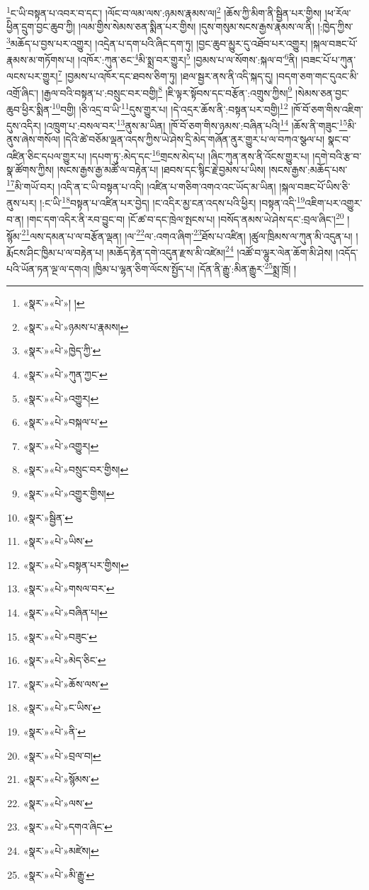 \footnote{«སྣར་»«པེ་»། །}ང་ཡི་བསྟན་པ་འབར་བ་དང་། །ལོང་བ་ལམ་ལས་:ཉམས་རྣམས་ལ།\footnote{«སྣར་»«པེ་»ཉམས་པ་རྣམས།} །ཆོས་ཀྱི་མིག་ནི་སྦྱིན་པར་གྱིས། །ཕ་རོལ་ཕྱིན་དྲུག་བྱང་ཆུབ་ཀྱི། །ལམ་གྱིས་སེམས་ཅན་སྨིན་པར་གྱིས། །དུས་གསུམ་སངས་རྒྱས་རྣམས་ལ་ནི། །:ཁྱེད་ཀྱིས་\footnote{«སྣར་»«པེ་»ཁྱེད་ཀྱི་}མཆོད་པ་བྱས་པར་འགྱུར། །འདྲེན་པ་དག་པའི་ཞིང་དག་ཏུ། །བྱང་ཆུབ་མྱུར་དུ་འཐོབ་པར་འགྱུར། །སྐལ་བཟང་པོ་རྣམས་མ་གཏོགས་པ། །འཁོར་:ཀུན་ཅང་\footnote{«སྣར་»«པེ་»ཀུན་ཀྱང་}མི་སྨྲ་བར་གྱུར།\footnote{«སྣར་»«པེ་»འགྱུར།} །བྱམས་པ་ལ་སོགས་:སྐལ་བ་\footnote{«སྣར་»«པེ་»བསྐལ་པ་}ནི། །བཟང་པོ་པ་ཀུན་ལངས་པར་གྱུར།\footnote{«སྣར་»«པེ་»འགྱུར།} །བྱམས་པ་འཁོར་དང་ཐབས་ཅིག་ཏུ། །ཐལ་སྦྱར་ནས་ནི་འདི་སྐད་དུ། །བདག་ཅག་གང་དུའང་མི་འགྲོ་ཞིང་། །རྒྱལ་བའི་བསྟན་པ་:བསྲུང་བར་བགྱི།\footnote{«སྣར་»«པེ་»བསྲུང་བར་གྱིས།} །ཇི་ལྟར་སྟོབས་དང་བརྩོན་:འགྲུས་ཀྱིས།\footnote{«སྣར་»«པེ་»འགྱུར་གྱིས།} །སེམས་ཅན་བྱང་ཆུབ་ཕྱིར་སྨིན་\footnote{«སྣར་»སྦྱིན་}བགྱི། །ཅི་འདྲ་བ་ཡི་\footnote{«སྣར་»«པེ་»ཡིས་}དུས་གྱུར་པ། །དེ་འདྲར་ཆོས་ནི་:བསྟན་པར་བགྱི།\footnote{«སྣར་»«པེ་»བསྟན་པར་གྱིས།} །ཁོ་བོ་ཅག་གིས་འཇིག་དུས་འདིར། །འཁྲུག་པ་:བསལ་བར་\footnote{«སྣར་»«པེ་»གསལ་བར་}ནུས་མ་ཡིན། །ཁོ་བོ་ཅག་གིས་ཉམས་:བཞིན་པའི།\footnote{«སྣར་»«པེ་»བཞིན་པ།} །ཆོས་ནི་གཟུང་\footnote{«སྣར་»«པེ་»བཟུང་}མི་ནུས་ཞེས་གསོལ། །དེའི་ཚེ་བཅོམ་ལྡན་འདས་ཀྱིས་ཡེ་ཤེས་དྲི་མེད་གཞོན་ནུར་གྱུར་པ་ལ་བཀའ་སྩལ་པ། སྣང་བ་འཛིན་ཅིང་དཔལ་གྱུར་པ། །དཔག་ཏུ་:མེད་དང་\footnote{«སྣར་»«པེ་»མེད་ཅིང་}གྲངས་མེད་པ། །ཞིང་ཀུན་ནས་ནི་འོངས་གྱུར་པ། །དགེ་བའི་རྩ་བ་སྣ་ཚོགས་ཀྱིས། །སངས་རྒྱས་རྒྱ་མཚོ་ལ་བརྟེན་པ། །ཐབས་དང་སྙིང་རྗེ་བྱམས་པ་ཡིས། །སངས་རྒྱས་:མཆོད་པས་\footnote{«སྣར་»«པེ་»ཆོས་ལས་}མི་གཡོ་བར། །འདི་ན་ང་ཡི་བསྟན་པ་འདི། །འཛིན་པ་གཅིག་འགའ་འང་ཡོད་མ་ཡིན། །སྐལ་བཟང་པོ་ཡིས་ཅི་ནུས་པར། །:ང་ཡི་\footnote{«སྣར་»«པེ་»ང་ཡིས་}བསྟན་པ་འཛིན་པར་བྱེད། །ང་འདིར་མྱ་ངན་འདས་པའི་ཕྱིར། །བསྟན་འདི་\footnote{«སྣར་»«པེ་»ནི་}འཇིག་པར་འགྱུར་བ་ན། །གང་དག་འདིར་ནི་རབ་བྱུང་བ། །ངོ་ཚ་བ་དང་ཁྲེལ་སྤངས་པ། །བསོད་ནམས་ཡེ་ཤེས་དང་:བྲལ་ཞིང་།\footnote{«སྣར་»«པེ་»བྲལ་བ།} །སྙོམ་\footnote{«སྣར་»«པེ་»སྙོམས་}ལས་དམན་པ་ལ་བརྩོན་ལྡན། །ལ་\footnote{«སྣར་»«པེ་»ལས་}ལ་:འགའ་ཞིག་\footnote{«སྣར་»«པེ་»དགའ་ཞིང་}ཐོས་པ་འཛིན། །ཚུལ་ཁྲིམས་ལ་ཀུན་མི་འདུན་པ། །རྨོངས་ཤིང་ཁྱིམ་པ་ལ་བརྟེན་པ། །མཆོད་རྟེན་དགེ་འདུན་རྫས་མི་འཛེམ།\footnote{«སྣར་»«པེ་»མཛེས།} །འཚོ་བ་ལྷུར་ལེན་ཆོག་མི་ཤེས། །འདོད་པའི་ཡོན་ཏན་ལྔ་ལ་དགའ། །ཁྱིམ་པ་ལྷན་ཅིག་ལོངས་སྤྱོད་པ། །དོན་ནི་རྒྱུ་:མིན་རྒྱུར་\footnote{«སྣར་»«པེ་»མི་རྒྱུ་}སྨྲ་ཁྲོ། །
